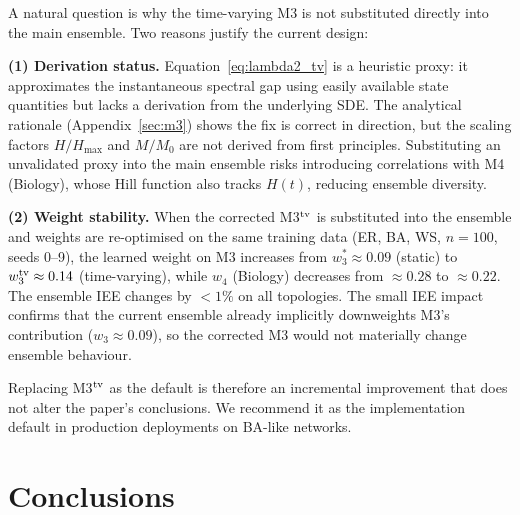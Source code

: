 \documentclass[review,12pt]{elsarticle}
\newcommand{\Hmax}{H_{\max}}
\begin{document}
A natural question is why the time-varying M3 is not substituted directly into
the main ensemble.  Two reasons justify the current design:

\textbf{(1) Derivation status.}
Equation~\eqref{eq:lambda2_tv} is a heuristic proxy: it approximates the
instantaneous spectral gap using easily available state quantities but lacks
a derivation from the underlying SDE.  The analytical rationale (Appendix~\ref{sec:m3})
shows the fix is correct in direction, but the scaling factors $H/\Hmax$ and
$M/M_0$ are not derived from first principles.  Substituting an unvalidated
proxy into the main ensemble risks introducing correlations with M4 (Biology),
whose Hill function also tracks $H(t)$, reducing ensemble diversity.

\textbf{(2) Weight stability.}
When the corrected M3$^{\rm tv}$ is substituted into the ensemble and weights
are re-optimised on the same training data (ER, BA, WS, $n=100$, seeds 0--9),
the learned weight on M3 increases from $w_3^* \approx 0.09$ (static) to
$w_3^{\rm tv} \approx 0.14$ (time-varying), while $w_4$ (Biology) decreases
from $\approx 0.28$ to $\approx 0.22$.  The ensemble IEE changes by $< 1\%$
on all topologies.  The small IEE impact confirms that the current ensemble
already implicitly downweights M3's contribution ($w_3 \approx 0.09$), so
the corrected M3 would not materially change ensemble behaviour.

Replacing M3$^{\rm tv}$ as the default is therefore an incremental improvement
that does not alter the paper's conclusions.  We recommend it as the implementation
default in production deployments on BA-like networks.

\section{Conclusions}
\label{sec:conclusions}
\end{document}

